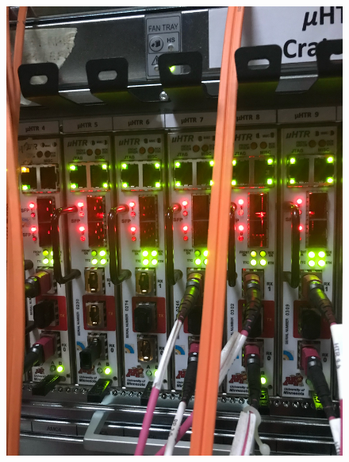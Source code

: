 \begin{figure}[!htbp]
    \includegraphics[scale=0.07]{fig/904BE.jpg}
	\label{fig:BackendCrate9041}
\end{figure}

